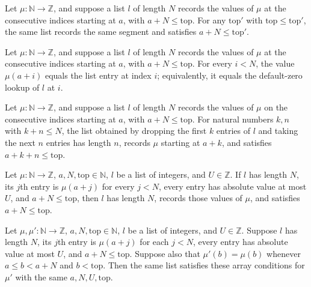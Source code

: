 \begin{theorem}
\label{Light.ListAt.mono}
\leanok
{}
Let $\mu:\mathbb N\to\mathbb Z$, and suppose a list $l$ of length $N$ records the values
of $\mu$ at the consecutive indices starting at $a$, with $a+N\le\mathrm{top}$. For any
$\mathrm{top}'$ with $\mathrm{top}\le\mathrm{top}'$, the same list records the same
segment and satisfies $a+N\le\mathrm{top}'$.
\end{theorem}

\begin{theorem}
\label{Light.ListAt.read}
\leanok
{}
Let $\mu:\mathbb N\to\mathbb Z$, and suppose a list $l$ of length $N$ records the values
of $\mu$ at the consecutive indices starting at $a$, with $a+N\le\mathrm{top}$. For
every $i<N$, the value $\mu(a+i)$ equals the list entry at index $i$; equivalently, it
equals the default-zero lookup of $l$ at $i$.
\end{theorem}

\begin{theorem}
\label{Light.ListAt.drop_take}
\leanok
{}
Let $\mu:\mathbb N\to\mathbb Z$, and suppose a list $l$ of length $N$ records the values
of $\mu$ on the consecutive indices starting at $a$, with $a+N\le\mathrm{top}$. For
natural numbers $k,n$ with $k+n\le N$, the list obtained by dropping the first $k$
entries of $l$ and taking the next $n$ entries has length $n$, records $\mu$ starting at
$a+k$, and satisfies $a+k+n\le\mathrm{top}$.
\end{theorem}

\begin{theorem}
\label{Light.ArrayAt.listAt}
\leanok
{}
Let $\mu:\mathbb{N}\to\mathbb{Z}$, $a,N,\mathrm{top}\in\mathbb{N}$, $l$ be a list of
integers, and $U\in\mathbb{Z}$. If $l$ has length $N$, its $j$th entry is $\mu(a+j)$ for
every $j<N$, every entry has absolute value at most $U$, and $a+N\le\mathrm{top}$, then
$l$ has length $N$, records those values of $\mu$, and satisfies $a+N\le\mathrm{top}$.
\end{theorem}

\begin{theorem}
\label{Light.ArrayAt.keep}
\leanok
{}
Let $\mu,\mu':\mathbb{N}\to\mathbb{Z}$, $a,N,\mathrm{top}\in\mathbb{N}$, $l$ be a list
of integers, and $U\in\mathbb{Z}$. Suppose $l$ has length $N$, its $j$th entry is
$\mu(a+j)$ for each $j<N$, every entry has absolute value at most $U$, and
$a+N\le\mathrm{top}$. Suppose also that $\mu'(b)=\mu(b)$ whenever $a\le b<a+N$ and
$b<\mathrm{top}$. Then the same list satisfies these array conditions for $\mu'$ with
the same $a,N,U,\mathrm{top}$.
\end{theorem}

